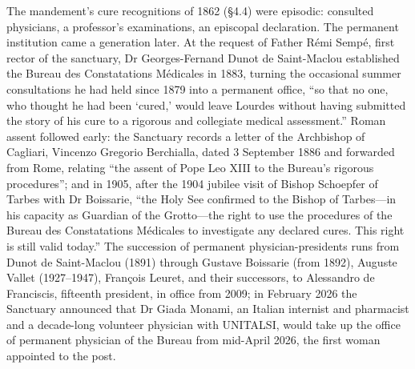 The mandement's cure recognitions of 1862 (\S4.4) were episodic:
consulted physicians, a professor's examinations, an episcopal
declaration. The permanent institution came a generation later. At
the request of Father R\'emi Semp\'e, first rector of the
sanctuary, Dr Georges-Fernand Dunot de Saint-Maclou established
the Bureau des Constatations M\'edicales in 1883, turning the
occasional summer consultations he had held since 1879 into a
permanent office, ``so that no one, who thought he had been
`cured,' would leave Lourdes without having submitted the story of
his cure to a rigorous and collegiate medical
assessment.'' Roman assent
followed early: the Sanctuary records a letter of the Archbishop
of Cagliari, Vincenzo Gregorio Berchialla, dated 3 September 1886
and forwarded from Rome, relating ``the assent of Pope Leo XIII to
the Bureau's rigorous procedures''; and in 1905, after the 1904
jubilee visit of Bishop Schoepfer of Tarbes with Dr Boissarie,
``the Holy See confirmed to the Bishop of Tarbes---in his capacity
as Guardian of the Grotto---the right to use the procedures of the
Bureau des Constatations M\'edicales to investigate any declared
cures. This right is still valid today.'' The succession of permanent physician-presidents runs
from Dunot de Saint-Maclou ({\dag}1891) through Gustave Boissarie
(from 1892), Auguste Vallet (1927--1947), Fran\c{c}ois Leuret, and
their successors, to Alessandro de Franciscis, fifteenth
president, in office from 2009; in February 2026 the Sanctuary
announced that Dr Giada Monami, an Italian internist and
pharmacist and a decade-long volunteer physician with UNITALSI,
would take up the office of permanent physician of the Bureau from
mid-April 2026, the first woman appointed to the
post.

